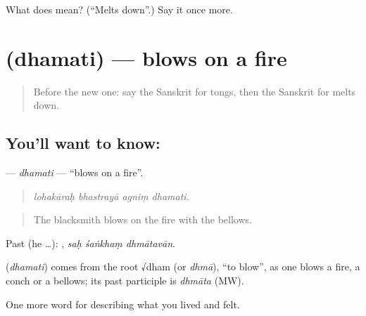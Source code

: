 \begin{tcolorbox}[breakable,colback=teal!4,colframe=teal!35!black,title={Before you move on}]
What does  mean? (\textquotedblleft{}Melts down\textquotedblright{}.) Say it once more.
\end{tcolorbox}
\section[\texorpdfstring{\sk{धमति} (dhamati)}{धमति (dhamati)}]{ (dhamati) — blows on a fire}

\label{lesson:SA-C507-dhamati}



\begin{quote}
Before the new one: say the Sanskrit for tongs, then the Sanskrit for melts down.
\end{quote}

\subsection*{You'll want to know: }
\textbf{} — \emph{dhamati} — \textquotedblleft{}blows on a fire\textquotedblright{}.

\begin{quote}
   
\end{quote}

\begin{quote}
\emph{lohakāraḥ bhastrayā agniṃ dhamati.}
\end{quote}

\begin{quote}
The blacksmith blows on the fire with the bellows.
\end{quote}

Past (he …):   , \emph{saḥ śaṅkhaṃ dhmātavān}.

\begin{cousinweb}
\textbf{} (\emph{dhamati}) comes from the root √dham (or \emph{dhmā}), \textquotedblleft{}to blow\textquotedblright{}, as one blows a fire, a conch or a bellows; its past participle is \emph{dhmāta} (MW).
\end{cousinweb}

\begin{grammarlens}[title={What you've built}]
One more word for describing what you lived and felt.
\end{grammarlens}

